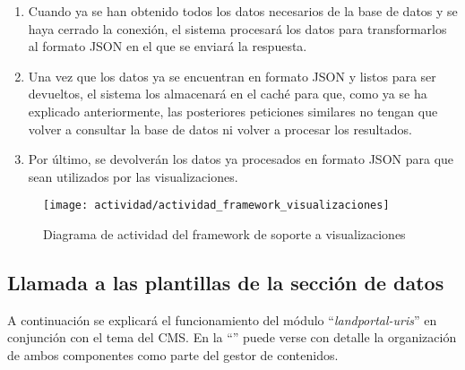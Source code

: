 \begin{enumerate}
\begin{enumerate}
		\end{enumerate}
	\item  Cuando ya se han obtenido todos los datos necesarios de la base de datos y se haya cerrado la conexión, el sistema procesará los datos para transformarlos al formato JSON en el que se enviará la respuesta.
	\item  Una vez que los datos ya se encuentran en formato JSON y listos para ser devueltos, el sistema los almacenará en el caché para que, como ya se ha explicado anteriormente, las posteriores peticiones similares no tengan que volver a consultar la base de datos ni volver a procesar los resultados.
	\item  Por último, se devolverán los datos ya procesados en formato JSON para que sean utilizados por las visualizaciones.
\end{enumerate}
\begin{figure}[h]
	\centering
	\texttt{[image: actividad/actividad\_framework\_visualizaciones]}
	\caption{Diagrama de actividad del framework de soporte a visualizaciones}
	\label{fig:diagrama_actividad_framework_soporte_visualizaciones}
\end{figure}

\subsection{Llamada a las plantillas de la sección de datos}
\label{actividad:landportal-uris_theme}
A continuación se explicará el funcionamiento del módulo ``\textit{landportal-uris}'' en conjunción con el tema del CMS.  En la ``'' puede verse con detalle la organización de ambos componentes como parte del gestor de contenidos.


